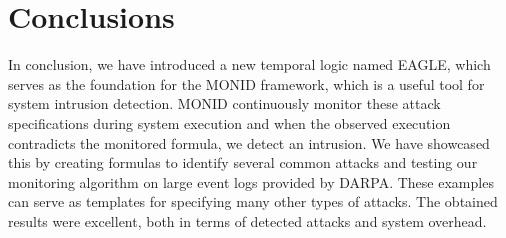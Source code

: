 \documentclass[english]{article}
\begin{document}
\section{Conclusions}
In conclusion, we have introduced a new temporal logic named EAGLE, which serves as the foundation for the MONID framework, which is a useful tool for system intrusion detection.
MONID continuously monitor these attack specifications during system execution and when the observed execution contradicts the monitored formula, we detect an intrusion. We have showcased this by creating formulas to identify several common attacks and testing our monitoring algorithm on large event logs provided by DARPA. These examples can serve as templates for specifying many other types of attacks. The obtained results were excellent, both in terms of detected attacks and system overhead.

\printbibliography
\end{document}
